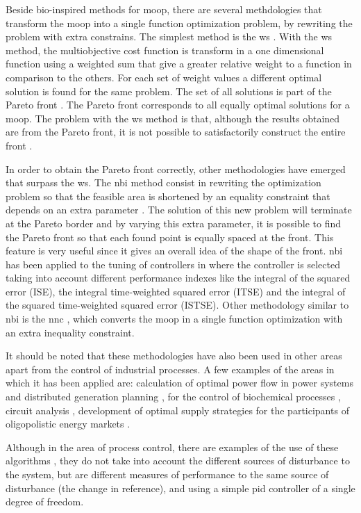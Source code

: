 Beside bio-inspired methods for \gls{moop}, there are several methdologies that transform the \gls{moop} into a single function optimization problem, by rewriting the problem with extra constrains. The simplest method is the \gls{ws} \citep{Marler2004}. With the \gls{ws} method, the multiobjective cost function is transform in a one dimensional function using a weighted sum that give a greater relative weight to a function in comparison to the others. For each set of weight values a different optimal solution is found for the same problem. The set of all solutions is part of the Pareto front \citep{Marler2004}. The Pareto front corresponds to all equally optimal solutions for a \gls{moop}. The problem with the \gls{ws} method is that, although the results obtained are from the Pareto front, it is not possible to satisfactorily construct the entire front \citep{Das1997,Messac2000,Marler2010}.

In order to obtain the Pareto front correctly, other methodologies have emerged that surpass the \gls{ws}. The \gls{nbi} method consist in rewriting the optimization problem so that the feasible area is shortened by an equality constraint that depends on an extra parameter \citep{Das1998}. The solution of this new problem will terminate at the Pareto border and by varying this extra parameter, it is possible to find the Pareto front so that each found point is equally spaced at the front. This feature is very useful since it gives an overall idea of the shape of the front. \gls{nbi} has been applied to the tuning of controllers in \citet{Gambier2009} where the controller is selected taking into account different performance indexes like the integral of the squared error (ISE), the integral time-weighted squared error (ITSE) and the integral of the squared time-weighted squared error (ISTSE). Other methodology similar to \gls{nbi} is the \gls{nnc} \citep{Messac2003}, which converts the \gls{moop} in a single function optimization with an extra inequality constraint.

It should be noted that these methodologies have also been used in other areas apart from the control of industrial processes. A few examples of the areas in which it has been applied are: calculation of optimal power flow in power systems \citep{Roman2006}  and distributed generation planning \citep{Zangeneh2007},  for the control of biochemical processes \citep{Logist2009}, circuit analysis \citep{Stehr2003}, development of optimal supply strategies for the participants of oligopolistic energy markets \citep{Vahidinasab2010}.

Although in the area of process control, there are examples of the use of these algorithms \citep{Gambier2009}, they do not take into account the different sources of disturbance to the system, but are different measures of performance to the same source of disturbance (the change in reference), and using a simple \gls{pid} controller of a single degree of freedom.

